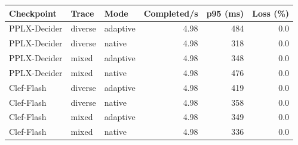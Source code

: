 \begin{tabular}{lllrrr}
\toprule
Checkpoint & Trace & Mode & Completed/s & p95 (ms) & Loss (\%) \\
\midrule
PPLX-Decider & diverse & adaptive & 4.98 & 484 & 0.0 \\
PPLX-Decider & diverse & native & 4.98 & 318 & 0.0 \\
PPLX-Decider & mixed & adaptive & 4.98 & 348 & 0.0 \\
PPLX-Decider & mixed & native & 4.98 & 476 & 0.0 \\
Clef-Flash & diverse & adaptive & 4.98 & 419 & 0.0 \\
Clef-Flash & diverse & native & 4.98 & 358 & 0.0 \\
Clef-Flash & mixed & adaptive & 4.98 & 349 & 0.0 \\
Clef-Flash & mixed & native & 4.98 & 336 & 0.0 \\
\bottomrule
\end{tabular}

